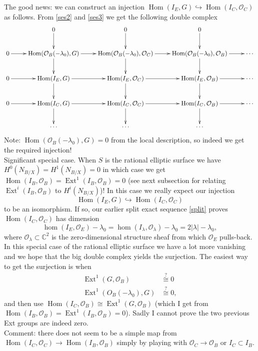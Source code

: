 \documentclass{amsart}
\theoremstyle{definition}
\newcommand{\CC} {\mathbb{C}}          %
\renewcommand{\O}{\mathcal{O}}
\newcommand{\Hom}{\operatorname{Hom}}
\renewcommand{\hom}{\operatorname{hom}}
\newcommand{\Ext}{\operatorname{Ext}}
\begin{document}
The good news: we can construct an injection $\Hom(I_E,G) \hookrightarrow \Hom(I_C,\O_C)$ as follows. From \eqref{ses2} and \eqref{ses3} we get the following double complex
\begin{displaymath}
\xymatrix
{
&0\ar[d]&0\ar[d]&0\ar[d]& \\
0 \ar[r] & \Hom(\O_B(-\lambda_0),G) \ar[d] \ar[r]& \Hom(\O_B(-\lambda_0),\O_C) \ar[d]\ar[r] & \Hom(\O_B(-\lambda_0),\O_B) \ar[d]\ar[r] & \cdots \\
0 \ar[r] & \Hom(I_E,G) \ar[d] \ar[r] & \Hom(I_E,\O_C) \ar[d]\ar[r] & \Hom(I_E,\O_B) \ar[d] \ar[r]& \cdots \\
0 \ar[r] & \Hom(I_C,G) \ar[d] \ar[r] & \Hom(I_C,\O_C) \ar[d] \ar[r] & \Hom(I_C,\O_B) \ar[d] \ar[r] & \cdots \\
&\cdots&\cdots&\cdots&
}
\end{displaymath}
Note: $\Hom(\O_B(-\lambda_0),G) = 0$ from the local description, so indeed we get the required injection! \\

Significant special case. When $S$ is the rational elliptic surface we have $H^0(N_{B/X}) = H^1(N_{B/X}) = 0$ in which case we get $\Hom(I_B,\O_B) = \Ext^1(I_B,\O_B) = 0$ (see next subsection for relating $\Ext^i(I_B,\O_B)$ to $H^i(N_{B/X})$)! In this case we really expect our injection
$$
\Hom(I_E,G) \hookrightarrow \Hom(I_C,\O_C)
$$
to be an isomorphism. If so, our earlier split exact sequence \eqref{split} proves $\Hom(I_C,\O_C)$ has dimension 
$$
\hom(I_E,\O_E) - \lambda_0 = \hom(I_\lambda, \O_\lambda) - \lambda_0 = 2|\lambda| - \lambda_0,
$$
where $\O_\lambda \subset \CC^{2}$ is the zero-dimensional structure sheaf from which $\O_E$ pulls-back. \\

In this special case of the rational elliptic surface we have a lot more vanishing and we hope that the big double complex yields the surjection. The easiest way to get the surjection is when
\begin{align*}
\Ext^1(G,\O_B) &\stackrel{?}{\cong} 0 \\
\Ext^1(O_B(-\lambda_0),G) &\stackrel{?}{\cong} 0,
\end{align*}
 and then use $\Hom(I_C,\O_B) \cong \Ext^1(G,\O_B)$ (which I get from $\Hom(I_B,\O_B) = \Ext^1(I_B,\O_B) = 0$). Sadly I cannot prove the two previous Ext groups are indeed zero. \\

Comment: there does not seem to be a simple map from $\Hom(I_C,\O_C) \rightarrow \Hom(I_B,\O_B)$ simply by playing with $\O_C \rightarrow \O_B$ or $I_C \subset I_B$. 
\end{document}
